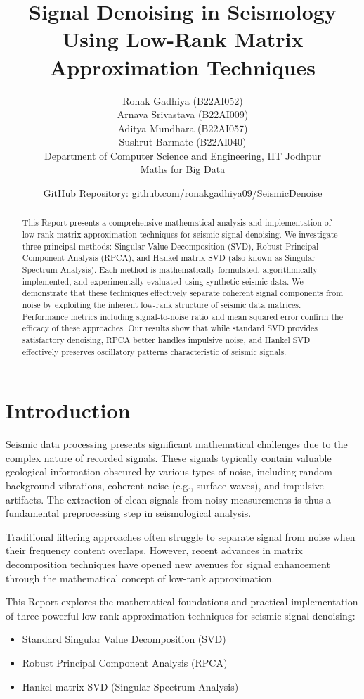\documentclass[11pt]{article}
\title{\Large \textbf{Signal Denoising in Seismology Using Low-Rank Matrix Approximation Techniques}}
\author{Ronak Gadhiya (B22AI052) \\ 
        Arnava Srivastava (B22AI009) \\
        Aditya Mundhara (B22AI057) \\
        Sushrut Barmate (B22AI040) \\
        Department of Computer Science and Engineering, IIT Jodhpur \\
        Maths for Big Data}
\date{\href{https://github.com/ronakgadhiya09/SeismicDenoise}{GitHub Repository: github.com/ronakgadhiya09/SeismicDenoise}}
\begin{document}
\maketitle

\begin{abstract}
This Report presents a comprehensive mathematical analysis and implementation of low-rank matrix approximation techniques for seismic signal denoising. We investigate three principal methods: Singular Value Decomposition (SVD), Robust Principal Component Analysis (RPCA), and Hankel matrix SVD (also known as Singular Spectrum Analysis). Each method is mathematically formulated, algorithmically implemented, and experimentally evaluated using synthetic seismic data. We demonstrate that these techniques effectively separate coherent signal components from noise by exploiting the inherent low-rank structure of seismic data matrices. Performance metrics including signal-to-noise ratio and mean squared error confirm the efficacy of these approaches. Our results show that while standard SVD provides satisfactory denoising, RPCA better handles impulsive noise, and Hankel SVD effectively preserves oscillatory patterns characteristic of seismic signals.
\end{abstract}

\section{Introduction}
Seismic data processing presents significant mathematical challenges due to the complex nature of recorded signals. These signals typically contain valuable geological information obscured by various types of noise, including random background vibrations, coherent noise (e.g., surface waves), and impulsive artifacts. The extraction of clean signals from noisy measurements is thus a fundamental preprocessing step in seismological analysis.

Traditional filtering approaches often struggle to separate signal from noise when their frequency content overlaps. However, recent advances in matrix decomposition techniques have opened new avenues for signal enhancement through the mathematical concept of low-rank approximation.

This Report explores the mathematical foundations and practical implementation of three powerful low-rank approximation techniques for seismic signal denoising:

\begin{itemize}
\item Standard Singular Value Decomposition (SVD)
\item Robust Principal Component Analysis (RPCA)
\item Hankel matrix SVD (Singular Spectrum Analysis)
\end{itemize}
\end{document}

